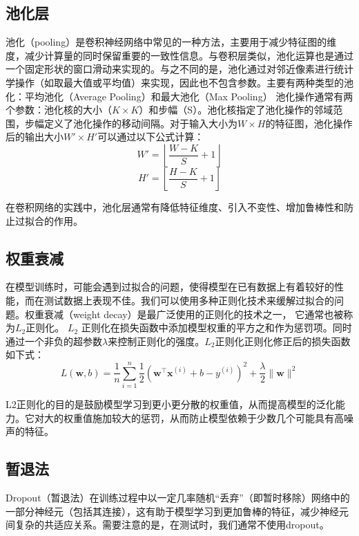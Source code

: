 \subsection{池化层}
池化（pooling）\cite{2022ComparisonPoolingMethodsConvolutionalNeuralNetworks}是卷积神经网络中常见的一种方法，主要用于减少特征图的维度，减少计算量的同时保留重要的一致性信息。与卷积层类似，池化运算也是通过一个固定形状的窗口滑动来实现的。与之不同的是，池化通过对邻近像素进行统计学操作（如取最大值或平均值）来实现，因此也不包含参数。主要有两种类型的池化：平均池化（Average Pooling）\cite{2022ComparisonPoolingMethodsConvolutionalNeuralNetworks}和最大池化（Max Pooling）\cite{2011Maxpoolingconvolutionalneuralnetworksvisionbasedhandgesturerecognition}
池化操作通常有两个参数：池化核的大小（\(K \times K\)）和步幅（S）。池化核指定了池化操作的邻域范围，步幅定义了池化操作的移动间隔。对于输入大小为$W \times H$的特征图，池化操作后的输出大小$W' \times H'$可以通过以下公式计算：
\begin{equation}
  W' = \left\lfloor\frac{W - K}{S} + 1\right\rfloor
\end{equation}
\begin{equation}
  H' = \left\lfloor\frac{H - K}{S} + 1\right\rfloor
\end{equation}

在卷积网络的实践中，池化层通常有降低特征维度、引入不变性、增加鲁棒性和防止过拟合的作用。

\subsection{权重衰减}
在模型训练时，可能会遇到过拟合的问题，使得模型在已有数据上有着较好的性能，而在测试数据上表现不佳。我们可以使用多种正则化技术来缓解过拟合的问题。权重衰减（weight decay）\cite{2012L2RegularizationLearningKernels}是最广泛使用的正则化的技术之一， 它通常也被称为$L_2$正则化。
$L_2$ 正则化在损失函数中添加模型权重的平方之和作为惩罚项。同时通过一个非负的超参数$\lambda$来控制正则化的强度。$L_2$正则化正则化修正后的损失函数如下式：
\begin{equation}
  L(\mathbf{w}, b)=\frac{1}{n} \sum_{i=1}^{n} \frac{1}{2}\left(\mathbf{w}^{\top} \mathbf{x}^{(i)}+b-y^{(i)}\right)^{2}+\frac{\lambda}{2}\|\mathbf{w}\|^{2}
\end{equation}

L2正则化的目的是鼓励模型学习到更小更分散的权重值，从而提高模型的泛化能力。它对大的权重值施加较大的惩罚，从而防止模型依赖于少数几个可能具有高噪声的特征。

\subsection{暂退法}
Dropout（暂退法）\cite{wu2021r}在训练过程中以一定几率随机“丢弃”（即暂时移除）网络中的一部分神经元（包括其连接），这有助于模型学习到更加鲁棒的特征，减少神经元间复杂的共适应关系。需要注意的是，在测试时，我们通常不使用dropout。
